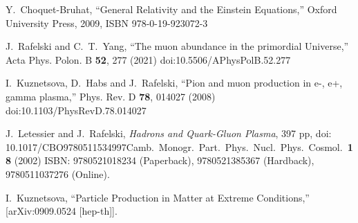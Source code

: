 \documentclass[Universe,article,submit,moreauthors,pdftex]{Definitions/mdpi}
\begin{document}
\begin{thebibliography}{99}
Y.~Choquet-Bruhat,
``General Relativity and the Einstein Equations,''
Oxford University Press, 2009,
ISBN 978-0-19-923072-3

J.~Rafelski and C.~T.~Yang,
``The muon abundance in the primordial Universe,''
Acta Phys. Polon. B \textbf{52}, 277 (2021)
doi:10.5506/APhysPolB.52.277

I.~Kuznetsova, D.~Habs and J.~Rafelski,
``Pion and muon production in e-, e+, gamma plasma,''
Phys. Rev. D \textbf{78}, 014027 (2008)
doi:10.1103/PhysRevD.78.014027


J.~Letessier and J.~Rafelski,
\emph{Hadrons and Quark-Gluon Plasma}, 
397 pp, doi: {10.1017/CBO9780511534997}{Camb.\ Monogr.\ Part.\ Phys.\ Nucl.\ Phys.\ Cosmol.\ {\bf 18} (2002)}
ISBN: 9780521018234 (Paperback), 9780521385367 (Hardback), 9780511037276 (Online).

I.~Kuznetsova,
``Particle Production in Matter at Extreme Conditions,''
[arXiv:0909.0524 [hep-th]].


\end{thebibliography}

\end{document}
